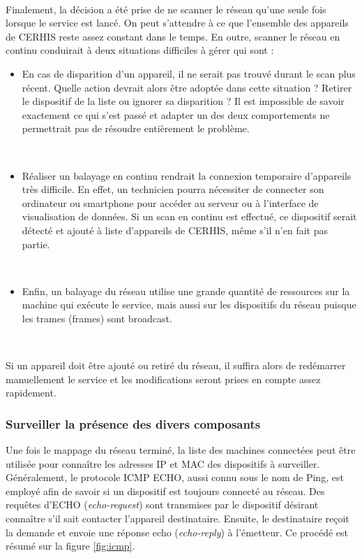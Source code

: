 ~

\noindent
Finalement, la décision a été prise de ne scanner le réseau qu'une seule fois lorsque le service est lancé. On peut s'attendre à ce que l'ensemble des appareils de CERHIS reste assez constant dans le temps. En outre, scanner le réseau en continu conduirait à deux situations difficiles à gérer qui sont :
\begin{itemize}
  \item En cas de disparition d'un appareil, il ne serait pas trouvé durant le scan plus récent. Quelle action devrait alors être adoptée dans cette situation ? Retirer le dispositif de la liste ou ignorer sa disparition ? Il est impossible de savoir exactement ce qui s'est passé et adapter un des deux comportements ne permettrait pas de résoudre entièrement le problème.

  ~

  \item Réaliser un balayage en continu rendrait la connexion temporaire d'appareils très difficile. En effet, un technicien pourra nécessiter de connecter son ordinateur ou smartphone pour accéder au serveur ou à l'interface de visualisation de données. Si un scan en continu est effectué, ce dispositif serait détecté et ajouté à liste d'appareils de CERHIS, même s'il n'en fait pas partie.

  ~

  \item 	Enfin, un balayage du réseau utilise une grande quantité de ressources sur la machine qui exécute le service, mais aussi sur les dispositifs du réseau puisque les trames (frames) sont broadcast.
\end{itemize}

~

\noindent
Si un appareil doit être ajouté ou retiré du réseau, il suffira alors de redémarrer manuellement le service et les modifications seront prises en compte assez rapidement.


\subsubsection{Surveiller la présence des divers composants}

\noindent
Une fois le mappage du réseau terminé, la liste des machines connectées peut être utilisée pour connaître les adresses IP et MAC des dispositifs à surveiller. Généralement, le protocole ICMP ECHO, aussi connu sous le nom de Ping, est employé afin de savoir si un dispositif est toujours connecté au réseau. Des requêtes d'ECHO (\textit{echo-request}) sont transmises par le dispositif désirant connaître s'il sait contacter l'appareil destinataire. Ensuite, le destinataire reçoit la demande et envoie une réponse echo (\textit{echo-reply}) à l'émetteur. Ce procédé est résumé sur la figure \ref{fig:icmp}.


